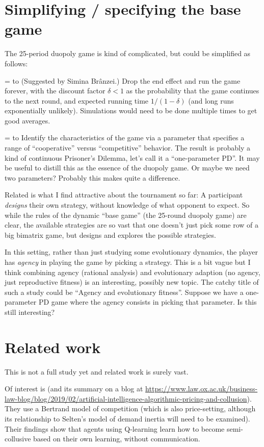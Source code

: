 \documentclass[a4paper,12pt]{article}  %
\def\rmitem#1{\par\hangafter=1\hangindent=\einr
  \noindent\hbox to\einr{\ignorespaces#1\hfill}\ignorespaces}
\newcommand\bullitem{\rmitem{\raise.17ex\hbox{\kern7pt\scriptsize$\bullet$}}}
\theoremstyle{definition}
\begin{document}
\section{Simplifying / specifying the base game}

The 25-period duopoly game is kind of complicated, but could
be simplified as follows:
\bullitem
(Suggested by Simina Br\^anzei.)
  Drop the end effect and run the game forever, with the
  discount factor $\delta<1$ as the probability that the game
  continues to the next round, and expected running time
  $1/(1-\delta)$ (and long runs exponentially unlikely).
  Simulations would need to be done multiple times to get
  good averages.
\bullitem
Identify the characteristics of the game via a parameter
that specifies a range of ``cooperative'' versus
``competitive'' behavior.
The result is probably a kind of
continuous Prisoner's Dilemma, let's call it a
``one-parameter PD''.
It may be useful to distill this as the essence of the
duopoly game. Or maybe we need two parameters? Probably this
makes quite a difference.

Related is what I find attractive about the tournament so
far: A participant \textit{designs} their own strategy, without
knowledge of what opponent to expect. So while the rules of the
dynamic ``base game'' (the 25-round duopoly game) are clear,
the available strategies are so vast that one doesn't just
pick some row of a big bimatrix game, but designs and
explores the possible strategies.

In this setting, rather than just studying some evolutionary
dynamics, the player has \textit{agency}
in playing the game by picking a strategy.
This is a bit vague but I think combining agency (rational
analysis) and evolutionary adaption (no agency, just
reproductive fitness) is an interesting, possibly new topic.
The catchy title of such a study could be 
``Agency and evolutionary fitness''.
Suppose we have a one-parameter PD game where the agency
consists in picking that parameter. Is this still
interesting?

\section{Related work}

This is not a full study yet and related work is surely
vast.

Of interest is \citet{calvano2020} (and its summary on a
blog at 
\url{https://www.law.ox.ac.uk/business-law-blog/blog/2019/02/artificial-intelligence-algorithmic-pricing-and-collusion}).
They use a Bertrand model of competition (which is also
price-setting, although its relationship to Selten's model
of demand inertia will need to be examined).
Their findings show that agents using Q-learning learn how
to become semi-collusive based on their own learning,
without communication.
\end{document}
